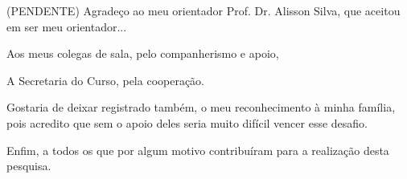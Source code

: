 (PENDENTE)
Agradeço ao meu orientador Prof. Dr. Alisson Silva, que aceitou em ser meu
orientador... 

Aos meus colegas de sala, pelo companherismo e apoio, 

A Secretaria do Curso, pela cooperação.

Gostaria de deixar registrado também, o meu reconhecimento à minha família, pois acredito que sem o apoio deles seria muito difícil vencer esse desafio. 

Enfim, a todos os que por algum motivo contribuíram para a realização desta pesquisa.
